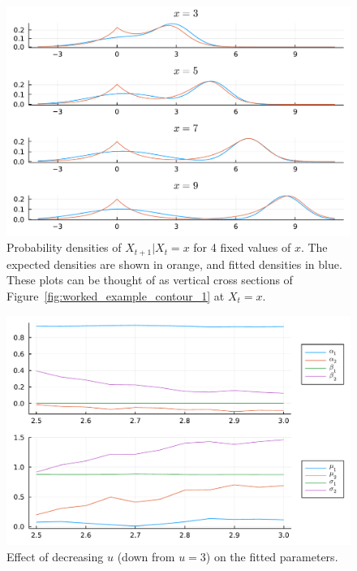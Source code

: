 \documentclass[11pt,twoside,openany]{book}
\numberwithin{Theorem}{chapter}
\numberwithin{Definition}{chapter}
\numberwithin{Lemma}{chapter}
\numberwithin{Algorithm}{chapter}
\numberwithin{equation}{chapter}
\begin{document}
\begin{figure}[htp]
  \centering
  \includegraphics[scale=0.7]{../ht-em/figures/worked_example_vs_true.pdf}
  \caption{Probability densities of $X_{t+1}|X_{t}=x$ for 4 fixed values of $x$.
    The expected densities are shown in orange, and fitted densities in blue.
    These plots can be thought of as vertical cross sections of Figure~\ref{fig:worked_example_contour_1} at
    $X_t=x$.
   }\label{fig:worked_example_vs_true_1}
\end{figure}
\begin{figure}[htp]
  \centering
  \includegraphics[scale=0.7]{../ht-em/figures/worked_example_check_u.pdf}
  \caption{Effect of decreasing $u$ (down from $u=3$) on the fitted parameters.}\label{fig:worked_example_1_check_u}
\end{figure}
\end{document}
